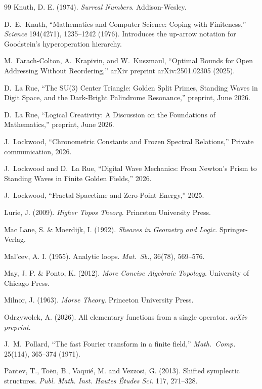 \begin{thebibliography}{99}
Knuth, D. E. (1974). \emph{Surreal Numbers}. Addison-Wesley.

D.~E.~Knuth,
``Mathematics and Computer Science: Coping with Finiteness,''
\emph{Science} 194(4271), 1235--1242 (1976).
Introduces the up-arrow notation for Goodstein's hyperoperation hierarchy.

M.~Farach-Colton, A.~Krapivin, and W.~Kuszmaul,
``Optimal Bounds for Open Addressing Without Reordering,''
arXiv preprint arXiv:2501.02305 (2025).

D.~La Rue, ``The SU(3) Center Triangle: Golden Split Primes, Standing Waves in Digit Space, and the Dark-Bright Palindrome Resonance,'' preprint, June 2026.

D.~La Rue, ``Logical Creativity: A Discussion on the Foundations of Mathematics,'' preprint, June 2026.

J.~Lockwood,
``Chronometric Constants and Frozen Spectral Relations,''
Private communication, 2026.

J.~Lockwood and D.~La Rue,
``Digital Wave Mechanics: From Newton's Prism to Standing Waves
in Finite Golden Fields,'' 2026.

J.~Lockwood,
``Fractal Spacetime and Zero-Point Energy,'' 2025.

Lurie, J. (2009). \emph{Higher Topos Theory}. Princeton University Press.

Mac Lane, S. \& Moerdijk, I. (1992). \emph{Sheaves in Geometry and Logic}. Springer-Verlag.

Mal'cev, A. I. (1955). Analytic loops. \emph{Mat.\ Sb.}, 36(78), 569--576.

May, J. P. \& Ponto, K. (2012). \emph{More Concise Algebraic Topology}. University of Chicago Press.

Milnor, J. (1963). \emph{Morse Theory}. Princeton University Press.

Odrzywolek, A. (2026). All elementary functions from a single operator. \emph{arXiv preprint}.

J.~M.~Pollard,
``The fast Fourier transform in a finite field,''
\emph{Math.\ Comp.} 25(114), 365--374 (1971).

Pantev, T., To\"en, B., Vaqui\'e, M. and Vezzosi, G. (2013). Shifted symplectic structures. \emph{Publ. Math. Inst. Hautes \'Etudes Sci.} 117, 271--328.


\end{thebibliography}
